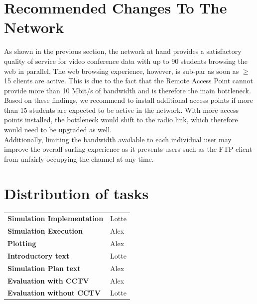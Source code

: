 \documentclass[
10pt, %
a4paper, %
oneside, %
headinclude,footinclude, %
BCOR5mm, %
]{scrartcl}
\begin{document}
\section{Recommended Changes To The Network}
As shown in the previous section, the network at hand provides a satisfactory quality of service for video conference data with up to 90 students browsing the web in parallel. The web browsing experience, however, is sub-par as soon as $\geq$ 15 clients are active. This is due to the fact that the Remote Access Point cannot provide more than 10 Mbit/s of bandwidth and is therefore the main bottleneck.\\
Based on these findings, we recommend to install additional access points if more than 15 students are expected to be active in the network. With more access points installed, the bottleneck would shift to the radio link, which therefore would need to be upgraded as well.\\
Additionally, limiting the bandwidth available to each individual user may improve the overall surfing experience as it prevents users such as the FTP client from unfairly occupying the channel at any time.

\newpage

\section{Distribution of tasks}

\begin{table}[H]
\begin{tabularx}{\textwidth}{ l l }
  \textbf{Simulation Implementation} & Lotte \\
  \textbf{Simulation Execution} & Alex \\
  \textbf{Plotting} & Alex \\
  \textbf{Introductory text} & Lotte \\
  \textbf{Simulation Plan text} & Alex \\
  \textbf{Evaluation with CCTV} & Alex \\
  \textbf{Evaluation without CCTV} & Lotte \\
\end{tabularx}
\end{table}
\end{document}
